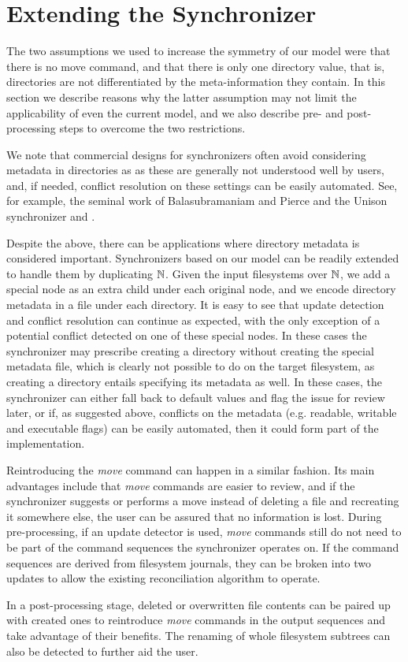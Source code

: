
\section{Extending the Synchronizer}

The two assumptions we used to increase the symmetry of our model were
that there is no move command,
and that
there is only one directory value, that is, directories are not differentiated
by the meta-information they contain.
In this section we describe reasons why the latter assumption may not limit the applicability
of even the current model, and we also describe pre- and post-processing steps
to overcome the two restrictions.

We note that commercial designs for synchronizers 
often avoid considering metadata in directories as
as these are generally not understood well by users,
and, if needed, conflict resolution on these settings can be easily automated.
See, for example, the seminal work of Balasubramaniam and Pierce and the Unison synchronizer \cite{BP} and \cite{BZ}.

Despite the above, there can be applications where directory metadata
is considered important.
Synchronizers based on our model can be readily extended to handle them
by duplicating $\mathbb{N}$. 
Given the input filesystems over $\mathbb{N}$, we add a special node as an extra child under each original node,
and we encode directory metadata in a file under each directory.
It is easy to see that update detection and conflict resolution can continue as expected,
with the only exception of a potential conflict detected on one of these special nodes.
In these cases the synchronizer may prescribe creating a directory without creating
the special metadata file, which is clearly not possible to do on the target filesystem,
as creating a directory entails specifying its metadata as well.
In these cases, the synchronizer can either fall back to default values and flag the issue
for review later, or if, as suggested above, conflicts on the metadata (e.g. readable, writable and executable flags)
can be easily automated, then it could form part of the implementation.

Reintroducing the \emph{move} command can happen in a similar fashion.
Its main advantages include that 
\emph{move} commands are easier to review,
and if the synchronizer suggests or performs a move instead
of deleting a file and recreating it somewhere else, the user
can be assured that no information is lost.
During pre-processing, if an update detector is used,
\emph{move} commands still do not need to be part of the command sequences
the synchronizer operates on.
If the command sequences are derived from filesystem journals, they
can be broken into two updates to allow the existing reconciliation
algorithm to operate.

In a post-processing stage, deleted or overwritten file contents
can be paired up with created ones to reintroduce \emph{move}
commands in the output sequences and take advantage of their benefits.
The renaming of whole filesystem subtrees can also be detected
to further aid the user.
